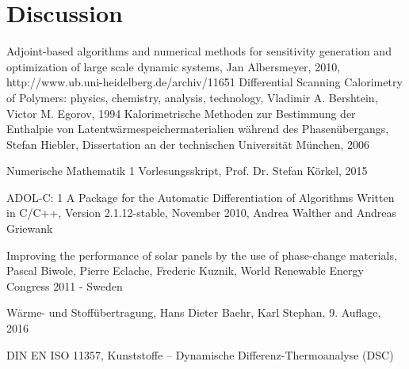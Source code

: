 \documentclass{scrartcl}[12pt, halfparskip]
\begin{document}
\section{Discussion}



\begin{thebibliography}{9}

	 Adjoint-based algorithms and numerical methods for sensitivity generation and optimization of large scale dynamic systems, 
	 Jan Albersmeyer, 2010,
	 http://www.ub.uni-heidelberg.de/archiv/11651
	Differential Scanning Calorimetry of Polymers: physics, chemistry, analysis, technology,
	Vladimir A. Bershtein, Victor M. Egorov,
	1994
	Kalorimetrische Methoden zur Bestimmung
	der Enthalpie von Latentwärmespeichermaterialien
	während des Phasenübergangs,
	Stefan Hiebler, Dissertation an der technischen Universität München, 2006
	
	Numerische Mathematik 1 Vorlesungsskript, 
	Prof. Dr. Stefan Körkel, 2015

	ADOL-C: 1
	A Package for the Automatic Differentiation
	of Algorithms Written in C/C++,
	Version 2.1.12-stable, November 2010,
	Andrea Walther and Andreas Griewank
	
	Improving the performance of solar panels by the use of phase-change materials,
	Pascal Biwole, Pierre Eclache, Frederic Kuznik,
	World Renewable Energy Congress 2011 - Sweden
	
	Wärme- und Stoffübertragung,
	Hans Dieter Baehr, Karl Stephan,
	9. Auflage, 2016
	
	DIN EN ISO 11357, 
	Kunststoffe –
	Dynamische Differenz-Thermoanalyse (DSC)
  
\end{thebibliography}
\end{document}
